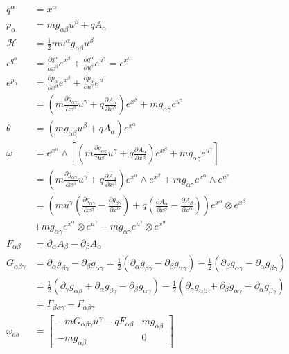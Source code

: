 \documentclass[11pt]{article}
\begin{document}
\begin{equation}
\begin{aligned}
q^\alpha &= x^\alpha \\
p_\alpha &= m g_{\alpha \beta} u^\beta + q A_\alpha \\
\mathcal{H} &= \frac{1}{2} m u^\alpha g_{\alpha\beta} u^\beta \\
e^{q^\alpha} &= \frac{\partial q^\alpha}{\partial x^\beta}e^{x^\beta} + \frac{\partial q^\alpha}{\partial u^\gamma}e^{u^\gamma} = e^{x^\alpha} \\
e^{p_\alpha} &= \frac{\partial p_\alpha}{\partial x^\beta}e^{x^\beta} + \frac{\partial p_\alpha}{\partial u^\gamma}e^{u^\gamma} \\
&= \left(m \frac{\partial g_{\alpha\gamma}}{\partial x^\beta} u^\gamma + q \frac{\partial A_\alpha}{\partial x^\beta} \right)e^{x^\beta} + m g_{\alpha \gamma} e^{u^\gamma} \\
\theta &= (m g_{\alpha \beta} u^\beta + q A_\alpha) e^{x^\alpha} \\
\omega &= e^{x^\alpha} \wedge \left[ \left(m \frac{\partial g_{\alpha\gamma}}{\partial x^\beta} u^\gamma + q \frac{\partial A_\alpha}{\partial x^\beta} \right)e^{x^\beta} + m g_{\alpha \gamma} e^{u^\gamma} \right] \\
&= \left(m \frac{\partial g_{\alpha\gamma}}{\partial x^\beta} u^\gamma + q \frac{\partial A_\alpha}{\partial x^\beta} \right) e^{x^\alpha} \wedge e^{x^\beta} + m g_{\alpha \gamma} e^{x^\alpha} \wedge e^{u^\gamma} \\
&= \left(m u^\gamma \left( \frac{\partial g_{\alpha\gamma}}{\partial x^\beta} -  \frac{\partial g_{\beta\gamma}}{\partial x^\alpha}\right) + q \left( \frac{\partial A_\alpha}{\partial x^\beta} - \frac{\partial A_\beta}{\partial x^\alpha}\right) \right) e^{x^\alpha} \otimes e^{x^\beta} \\
&+ m g_{\alpha \gamma} e^{x^\alpha} \otimes e^{u^\gamma} - m g_{\alpha \gamma} e^{u^\gamma} \otimes e^{x^\alpha} \\
F_{\alpha\beta} &= \partial_\alpha A_\beta - \partial_\beta A_\alpha \\
G_{\alpha\beta\gamma} &= \partial_\alpha g_{\beta \gamma} - \partial_\beta g_{\alpha \gamma} = \frac{1}{2} (\partial_\alpha g_{\beta \gamma} - \partial_\beta g_{\alpha \gamma}) - \frac{1}{2} (\partial_\beta g_{\alpha \gamma} - \partial_\alpha g_{\beta \gamma}) \\
&= \frac{1}{2} (\partial_\gamma g_{\alpha \beta} + \partial_\alpha g_{\beta \gamma} - \partial_\beta g_{\alpha \gamma}) - \frac{1}{2} (\partial_\gamma g_{\alpha \beta} + \partial_\beta g_{\alpha \gamma} - \partial_\alpha g_{\beta \gamma}) \\
&= \Gamma_{\beta\alpha\gamma} - \Gamma_{\alpha\beta\gamma} \\
\omega_{ab} &= \left[ \begin{matrix}
- m G_{\alpha\beta\gamma} u^\gamma - q F_{\alpha\beta} & mg_{\alpha \beta} \\[2.2ex]
- mg_{\alpha \beta} & 0 \end{matrix} \right] \\
\end{aligned}
\end{equation}
\end{document}
